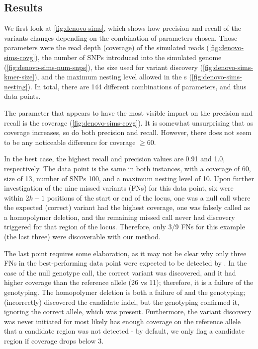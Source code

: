 \subsection{Results}
\label{sec:denovo-sims-results}

We first look at \autoref{fig:denovo-sims}, which shows how precision and recall of the \pandora{} \denovo{} variants changes depending on the combination of parameters chosen. Those parameters were the read depth (coverage) of the simulated reads (\autoref{fig:denovo-sims-covg}), the number of SNPs introduced into the simulated genome (\autoref{fig:denovo-sims-num-snps}), the \kmer{} size used for variant discovery (\autoref{fig:denovo-sims-kmer-size}), and the maximum nesting level allowed in the \prg{}s (\autoref{fig:denovo-sims-nesting}). In total, there are 144 different combinations of parameters, and thus data points.

The parameter that appears to have the most visible impact on the precision and recall is the coverage (\autoref{fig:denovo-sims-covg}). It is somewhat unsurprising that as coverage increases, so do both precision and recall. However, there does not seem to be any noticeable difference for coverage $\ge 60$.

In the best case, the highest recall and precision values are 0.91 and 1.0, respectively. The data point is the same in both instances, with a coverage of 60, \kmer{} size of 13, number of SNPs 100, and a maximum nesting level of 10. Upon further investigation of the nine missed variants (FNs) for this data point, six were within $2k-1$ positions of the start or end of the locus, one was a null call where the expected (correct) variant had the highest coverage, one was falsely called as a homopolymer deletion, and the remaining missed call never had \denovo{} discovery triggered for that region of the locus. Therefore, only 3/9 FNs for this example (the last three) were discoverable with our \denovo{} method.

The last point requires some elaboration, as it may not be clear why only three FNs in the best-performing data point were expected to be detected by \denovo{}. In the case of the null genotype call, the correct variant was discovered, and it had higher coverage than the reference allele (26 vs 11); therefore, it is a failure of the genotyping. The homopolymer deletion is both a failure of \denovo{} and the genotyping; \denovo{} (incorrectly) discovered the candidate indel, but the genotyping confirmed it, ignoring the correct allele, which was present. Furthermore, the variant \denovo{} discovery was never initiated for most likely has enough coverage on the reference allele that a candidate region was not detected - by default, we only flag a candidate region if coverage drops below 3.

